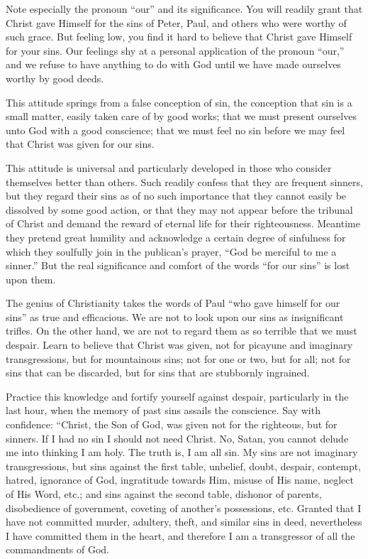 Note especially the pronoun “our” and its significance. You will readily grant that Christ gave Himself for the sins of Peter, Paul, and others who were worthy of such grace. But feeling low, you find it hard to believe that Christ gave Himself for your sins. Our feelings shy at a personal application of the pronoun “our,” and we refuse to have anything to do with God until we have made ourselves worthy by good deeds.

This attitude springs from a false conception of sin, the conception that sin is a small matter, easily taken care of by good works; that we must present ourselves unto God with a good conscience; that we must feel no sin before we may feel that Christ was given for our sins.

This attitude is universal and particularly developed in those who consider themselves better than others. Such readily confess that they are frequent sinners, but they regard their sins as of no such importance that they cannot easily be dissolved by some good action, or that they may not appear before the tribunal of Christ and demand the reward of eternal life for their righteousness. Meantime they pretend great humility and acknowledge a certain degree of sinfulness for which they soulfully join in the publican’s prayer, “God be merciful to me a sinner.” But the real significance and comfort of the words “for our sins” is lost upon them.

The genius of Christianity takes the words of Paul “who gave himself for our sins” as true and efficacious. We are not to look upon our sins as insignificant trifles. On the other hand, we are not to regard them as so terrible that we must despair. Learn to believe that Christ was given, not for picayune and imaginary transgressions, but for mountainous sins; not for one or two, but for all; not for sins that can be discarded, but for sins that are stubbornly ingrained.

Practice this knowledge and fortify yourself against despair, particularly in the last hour, when the memory of past sins assails the conscience. Say with confidence: “Christ, the Son of God, was given not for the righteous, but for sinners. If I had no sin I should not need Christ. No, Satan, you cannot delude me into thinking I am holy. The truth is, I am all sin. My sins are not imaginary transgressions, but sins against the first table, unbelief, doubt, despair, contempt, hatred, ignorance of God, ingratitude towards Him, misuse of His name, neglect of His Word, etc.; and sins against the second table, dishonor of parents, disobedience of government, coveting of another’s possessions, etc. Granted that I have not committed murder, adultery, theft, and similar sins in deed, nevertheless I have committed them in the heart, and therefore I am a transgressor of all the commandments of God.

